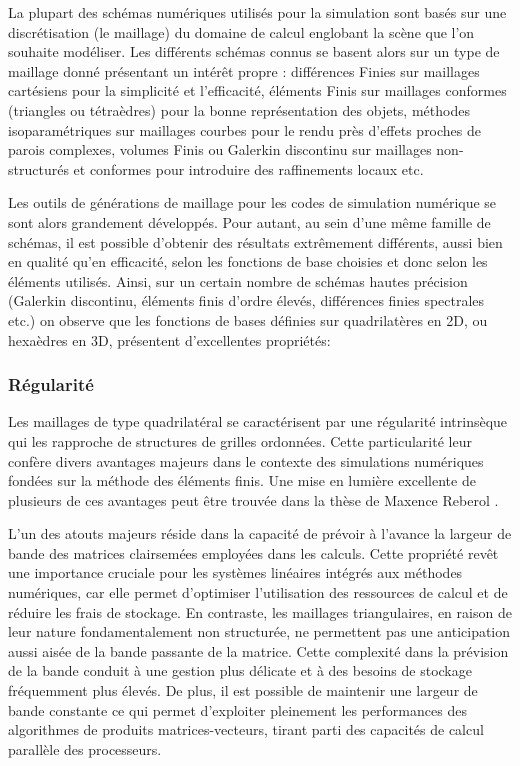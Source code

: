 La plupart des schémas numériques utilisés pour la simulation sont basés sur une discrétisation (le maillage) du domaine de calcul englobant la scène que l'on souhaite modéliser. Les différents schémas connus se basent alors sur un type de maillage donné présentant un intérêt propre : différences Finies sur maillages cartésiens pour la simplicité et l'efficacité, éléments Finis sur maillages conformes (triangles ou tétraèdres) pour la bonne représentation des objets, méthodes isoparamétriques sur maillages courbes pour le rendu près d'effets proches de parois complexes, volumes Finis ou Galerkin discontinu sur maillages non-structurés et conformes pour introduire des raffinements locaux etc.

Les outils de générations de maillage pour les codes de simulation numérique se sont alors grandement développés. Pour autant, au sein d'une même famille de schémas, il est possible d'obtenir des résultats extrêmement différents, aussi bien en qualité qu'en efficacité, selon les fonctions de base choisies et donc selon les éléments utilisés. Ainsi, sur un certain nombre de schémas hautes précision (Galerkin discontinu, éléments finis d'ordre élevés, différences finies spectrales etc.) on observe que les fonctions de bases définies sur quadrilatères en 2D, ou hexaèdres en 3D, présentent d'excellentes propriétés:

\subsubsection{Régularité}

Les maillages de type quadrilatéral se caractérisent par une régularité intrinsèque qui les rapproche de structures de grilles ordonnées. Cette particularité leur confère divers avantages majeurs dans le contexte des simulations numériques fondées sur la méthode des éléments finis. Une mise en lumière excellente de plusieurs de ces avantages peut être trouvée dans la thèse de Maxence Reberol \cite{reberol2018maillages}.

L'un des atouts majeurs réside dans la capacité de prévoir à l'avance la largeur de bande des matrices clairsemées employées dans les calculs. Cette propriété revêt une importance cruciale pour les systèmes linéaires intégrés aux méthodes numériques, car elle permet d'optimiser l'utilisation des ressources de calcul et de réduire les frais de stockage. En contraste, les maillages triangulaires, en raison de leur nature fondamentalement non structurée, ne permettent pas une anticipation aussi aisée de la bande passante de la matrice. Cette complexité dans la prévision de la bande conduit à une gestion plus délicate et à des besoins de stockage fréquemment plus élevés. De plus, il est possible de maintenir une largeur de bande constante ce qui permet d'exploiter pleinement les performances des algorithmes de produits matrices-vecteurs, tirant parti des capacités de calcul parallèle des processeurs.

